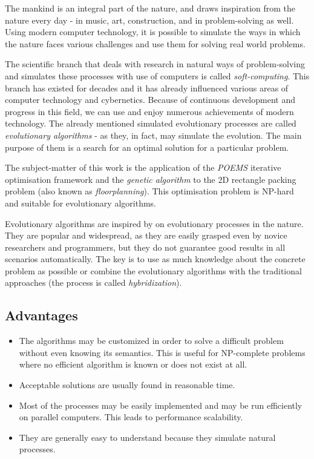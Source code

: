 The mankind is an integral part of the nature, and draws inspiration from the nature every day - in music, art, construction, and in problem-solving as well. Using modern computer technology, it is possible to simulate the ways in which the nature faces various challenges and use them for solving real world problems.

The scientific branch that deals with research in natural ways of problem-solving and simulates these processes with use of computers is called {\em soft-computing}. This branch has existed for decades and it has already influenced various areas of computer technology and cybernetics. Because of continuous development and progress in this field, we can use and enjoy numerous achievements of modern technology. The already mentioned simulated evolutionary processes are called {\em evolutionary algorithms} - as they, in fact, may simulate the evolution. The main purpose of them is a search for an optimal solution for a particular problem.

The subject-matter of this work is the application of the {\em POEMS} iterative optimisation framework \cite{poems} and the {\em genetic algorithm} to the 2D rectangle packing problem (also known as {\em floorplanning}). This optimisation problem is NP-hard and suitable for evolutionary algorithms.

Evolutionary algorithms are inspired by on evolutionary processes in the nature. They are popular and widespread, as they are easily grasped even by novice researchers and programmers, but they do not guarantee good results in all scenarios automatically. The key \cite{hynek} is to use as much knowledge about the concrete problem as possible or combine the evolutionary algorithms with the traditional approaches (the process is called {\em hybridization}).

\subsection{Advantages}

\begin{itemize}
\item{The algorithms may be customized in order to solve a difficult problem without even knowing its semantics. This is useful for NP-complete problems where no efficient algorithm is known or does not exist at all.}
\item{Acceptable solutions are usually found in reasonable time.}
\item{Most of the processes may be easily implemented and may be run efficiently on parallel computers. This leads to performance scalability.}
\item{They are generally easy to understand because they simulate natural processes.}
\end{itemize}

